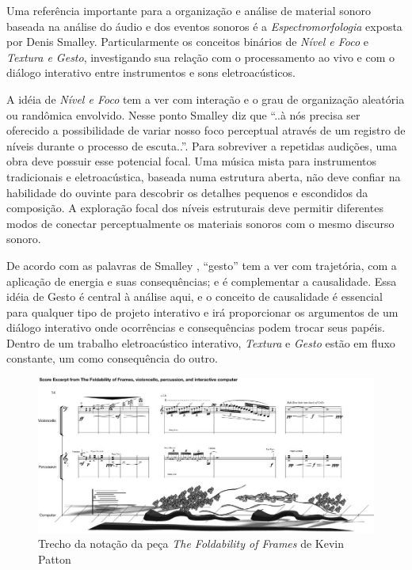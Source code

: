 \documentclass{ppgmus}
\begin{document}
Uma referência importante para a organização e análise de material sonoro baseada
na análise do áudio e dos eventos sonoros é a \textit{Espectromorfologia} exposta por Denis
Smalley. Particularmente os conceitos binários de \textit{Nível e Foco} e \textit{Textura e Gesto},
investigando sua relação com o processamento ao vivo e com o diálogo interativo entre
instrumentos e sons eletroacústicos.

A idéia de \textit{Nível e Foco} tem a ver com interação e o grau de organização aleatória
ou randômica envolvido. Nesse ponto Smalley diz que ``..à nós precisa ser oferecido
a possibilidade de variar nosso foco perceptual através de um registro de níveis 
durante o processo de escuta..''. Para sobreviver a repetidas audições, uma obra deve 
possuir esse potencial focal. Uma música mista para instrumentos tradicionais e eletroacústica, 
baseada numa estrutura aberta, não deve confiar na habilidade do ouvinte para descobrir
os detalhes pequenos e escondidos da composição. A exploração focal dos níveis estruturais
deve permitir diferentes modos de conectar perceptualmente os materiais sonoros com 
o mesmo discurso sonoro. 

De acordo com as palavras de Smalley \cite{emmersonsimon:86}, ``gesto'' tem a ver 
com trajetória, com a aplicação de energia e suas consequências; e é complementar
a causalidade. Essa idéia de Gesto é central à análise aqui, e o conceito de causalidade
é essencial para qualquer tipo de projeto interativo e irá proporcionar os argumentos
de um diálogo interativo onde ocorrências e consequências podem trocar seus papéis.
Dentro de um trabalho eletroacústico interativo, \textit{Textura} e \textit{Gesto} 
estão em fluxo constante, um como consequência do outro. 

\begin{figure}
\includegraphics[scale=.5]{espectromorfologia}
\caption{Trecho da notação da peça \textit{The Foldability of Frames} de Kevin Patton }
\label{espectromorfologia}
\end{figure}
\end{document}
